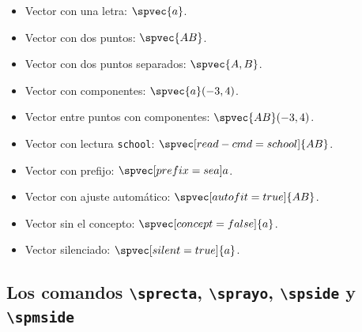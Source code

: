 \documentclass{article}
\begin{document}
\begin{itemize}
  \item Vector con una letra: $\spvec{a}$.
  \item Vector con dos puntos: $\spvec{AB}$.
  \item Vector con dos puntos separados: $\spvec{A,B}$.
  \item Vector con componentes: $\spvec{a}(-3,4)$.
  \item Vector entre puntos con componentes: $\spvec{AB}(-3,4)$.
  \item Vector con lectura \texttt{school}: $\spvec[read-cmd=school]{AB}$.
  \item Vector con prefijo: $\spvec[prefix={sea}]{a}$.
  \item Vector con ajuste automático: $\spvec[autofit=true]{AB}$.
  \item Vector sin el concepto: $\spvec[concept=false]{a}$.
  \item Vector silenciado: $\spvec[silent=true]{a}$.
\end{itemize}

\subsection*{Los comandos \texttt{\textbackslash sprecta}, \texttt{\textbackslash sprayo}, \texttt{\textbackslash spside} y \texttt{\textbackslash spmside}}
\end{document}
